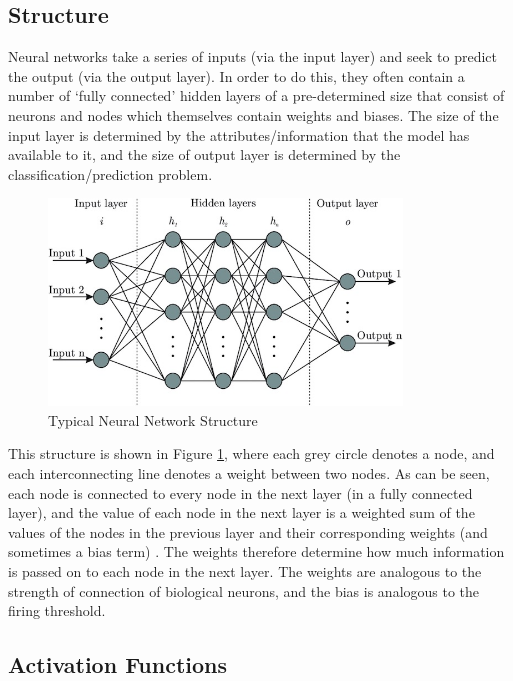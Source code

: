 \subsection{Structure}
\label{sec:background_anns_structure}
Neural networks take a series of inputs (via the input layer) and seek to predict the output (via the output layer). In order to do this, they often contain a number of `fully connected' hidden layers of a pre-determined size that consist of neurons and nodes which themselves contain weights and biases. The size of the input layer is determined by the attributes/information that the model has available to it, and the size of output layer is determined by the classification/prediction problem. 

\begin{figure}[h]
    \centering
    \includegraphics[height=5.5cm] {Paper/images/neural_network_structure.jpeg} %
    \caption{Typical Neural Network Structure \citep{Shukla}}
    \label{fig:neural_network_structure}
\end{figure}

This structure is shown in Figure \ref{fig:neural_network_structure}, where each grey circle denotes a node, and each interconnecting line denotes a weight between two nodes. As can be seen, each node is connected to every node in the next layer (in a fully connected layer), and the value of each node in the next layer is a weighted sum of the values of the nodes in the previous layer and their corresponding weights (and sometimes a bias term) \citep{Bishop}. The weights therefore determine how much information is passed on to each node in the next layer. The weights are analogous to the strength of connection of biological neurons, and the bias is analogous to the firing threshold.

\subsection{Activation Functions}
\label{sec:background_anns_activation_functions}

